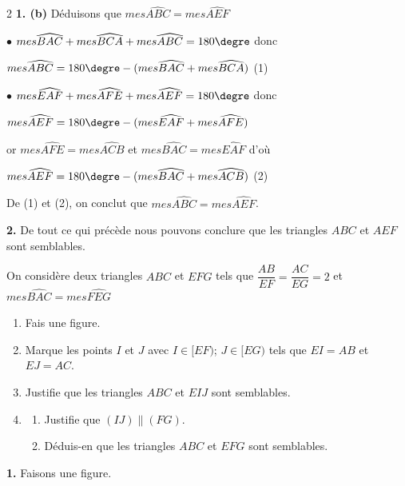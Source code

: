 \begin{multicols*}{2}
  	\textbf{1. (b)}  Déduisons que $mes\widehat{ABC}=mes\widehat{AEF}$
  	
  	$\bullet$ $mes\widehat{BAC}+mes\widehat{BCA}+mes\widehat{ABC}=180\textrm{\degre}$ donc
  	
  	$mes\widehat{ABC}=180\textrm{\degre}-(mes\widehat{BAC}+mes\widehat{BCA})$ (1)
  	
  	$\bullet$ $mes\widehat{EAF}+mes\widehat{AFE}+mes\widehat{AEF}=180\textrm{\degre}$ donc
  	
  	$mes\widehat{AEF}=180\textrm{\degre}-(mes\widehat{EAF}+mes\widehat{AFE})$
  	
  	or $mes\widehat{AFE}=mes\widehat{ACB}$ et $mes\widehat{BAC}=mes\widehat{EAF}$ d'où
  	
  	$mes\widehat{AEF}=180\textrm{\degre}-(mes\widehat{BAC}+mes\widehat{ACB})$ (2)
  	
  	De (1) et (2), on conclut que $mes\widehat{ABC}=mes\widehat{AEF}$.
  	
  	\textbf{2.} De tout ce qui précède nous pouvons conclure que les triangles $ABC$ et $AEF$ sont semblables.
  	
  	
  	On considère deux triangles $ABC$ et $EFG$ tels que $\dfrac{AB}{EF}=\dfrac{AC}{EG}=2$ et $mes\widehat{BAC}=mes\widehat{FEG}$
  	\begin{enumerate} 
  		\item Fais une figure.
  		\item Marque les points $I$ et $J$ avec $I\in[EF)$; $J\in[EG)$ tels que $EI=AB$ et $EJ=AC$.
  		\item Justifie que les triangles $ABC$ et $EIJ$ sont  semblables.
  		\item 
  		\begin{enumerate} 	
  			\item  Justifie que $(IJ)\parallel(FG)$.
  			\item Déduis-en que les triangles $ABC$ et $EFG$ sont  semblables.
  		\end{enumerate}
  	\end{enumerate}
  	\dure
  	\resul
  	\textbf{1.} Faisons une figure.
  	

\end{multicols*}
